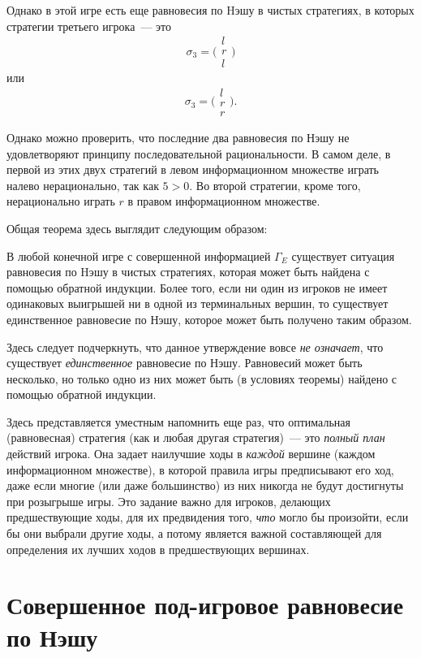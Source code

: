 Однако в этой игре есть еще равновесия по Hэшу в чистых стратегиях,
в которых стратегии третьего игрока~--- это
$$
\sigma_3=\Biggl(\begin{array}{c} l\\ r\\ l \end{array}\Biggr)
$$
или
$$
\sigma_3=\Biggl(\begin{array}{c}l\\ r\\ r \end{array}\Biggr).
$$

Однако можно проверить, что последние два равновесия по Нэшу не удовлетворяют
принципу последовательной рациональности. В самом деле, в первой
из этих двух стратегий в левом информационном множестве играть налево
нерационально, так как $5>0$. Во второй стратегии, кроме того,
нерационально играть $r$ в правом информационном множестве.

Общая теорема здесь выглядит следующим образом:
\begin{proposition}
В любой конечной игре с совершенной информацией $\Gamma_E$
существует ситуация равновесия по Hэшу в чистых стратегиях, которая
может быть найдена с помощью обратной индукции. Более того, если ни
один из игроков не имеет одинаковых выигрышей ни в одной из
терминальных вершин, то существует единственное равновесие по Нэшу, которое может
быть получено таким образом.
\end{proposition}

Здесь следует подчеркнуть, что данное утверждение вовсе \emph{не означает},
что существует \emph{единственное} равновесие по Нэшу. Равновесий может
быть несколько, но только одно из них может быть (в условиях
теоремы) найдено с помощью обратной индукции.

Здесь представляется уместным напомнить еще раз, что оптимальная
(равновесная) стратегия (как и любая другая стратегия)~--- это \emph{
полный план} действий игрока. Она задает наилучшие ходы в \emph{каждой}
вершине (каждом информационном множестве), в которой правила игры предписывают
его ход, даже если многие (или даже большинство) из них никогда не будут
достигнуты при розыгрыше игры. Это задание важно для игроков, делающих
предшествующие ходы, для их предвидения того, \emph{что} могло бы
произойти, если бы они выбрали другие ходы, а потому является важной
составляющей для определения их лучших ходов в предшествующих вершинах.



\section{Совершенное под-игровое равновесие по Нэшу}

